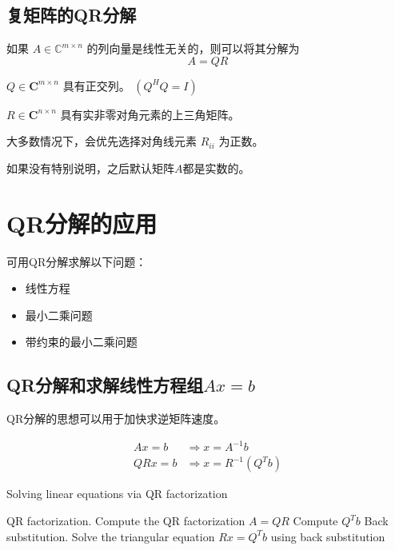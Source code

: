 
\subsection{复矩阵的QR分解}

\begin{theorem}
    如果 $A \in \mathbb{C}^{m \times n}$ 的列向量是线性无关的，则可以将其分解为
\begin{equation}
A=Q R
\end{equation}

$Q \in \boldsymbol{C}^{m \times n}$ 具有正交列。 $\left(Q^{H} Q=I\right)$

$R \in \boldsymbol{C}^{n \times n}$ 具有实非零对角元素的上三角矩阵。
\end{theorem}

大多数情况下，会优先选择对角线元素 $R_{i i}$ 为正数。

如果没有特别说明，之后默认矩阵$A$都是实数的。

\section{QR分解的应用}

可用QR分解求解以下问题：

\begin{itemize}
    \item 线性方程
    \item 最小二乘问题
    \item 带约束的最小二乘问题
\end{itemize}

\subsection{QR分解和求解线性方程组$Ax = b$}
\label{complexity:qr-solves-Ax-eqs-b}

QR分解的思想可以用于加快求逆矩阵速度。

\begin{corollary}
\begin{equation}\begin{aligned}
   Ax = b &\Rightarrow x = A^{-1} b \\
QRx = b &\Rightarrow x = R^{-1} \left(Q^Tb\right)
\end{aligned}
\end{equation}
\end{corollary}

\begin{algorithm}[htbp]
    \caption{Solving linear equations via QR factorization}
    
    QR factorization. Compute the QR factorization $ A=Q R $\;
    Compute $ Q^{T} b $\;
    Back substitution. Solve the triangular equation $ R x=Q^{T} b $ using back substitution\;
\end{algorithm}


